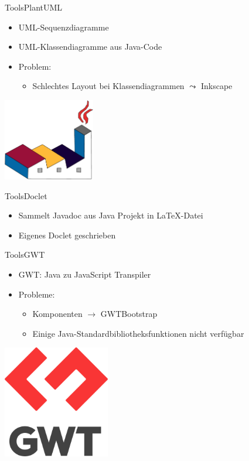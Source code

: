 \documentclass[10pt]{beamer}
\begin{document}
\begin{frame}[t]{Tools}{PlantUML}
	\begin{itemize}
		\item UML-Sequenzdiagramme
		\item UML-Klassendiagramme aus Java-Code
		\item Problem: 
			\begin{itemize}
				\item Schlechtes Layout bei Klassendiagrammen $\leadsto$ Inkscape
			\end{itemize}
	\end{itemize}
	\vspace{2cm}
    \hfill\includegraphics[width = 0.3\textwidth]{img/plantuml-cropped}
\end{frame}

\begin{frame}[t]{Tools}{Doclet}
	\begin{itemize}
		\item Sammelt Javadoc aus Java Projekt in \LaTeX{}-Datei
		\item Eigenes Doclet geschrieben
	\end{itemize}
\end{frame}

\begin{frame}{Tools}{GWT}
	\begin{itemize}
		\item GWT: Java zu JavaScript Transpiler 
		\item Probleme: 
		\begin{itemize}
			\item Komponenten $\rightarrow$ GWTBootstrap
			\item Einige Java-Standardbibliotheksfunktionen nicht verfügbar
		\end{itemize}
	\end{itemize}
	\vspace{3.4cm}
    \hfill\includegraphics[width = 0.35\textwidth]{img/gwt-cropped}
\end{frame}
\end{document}
